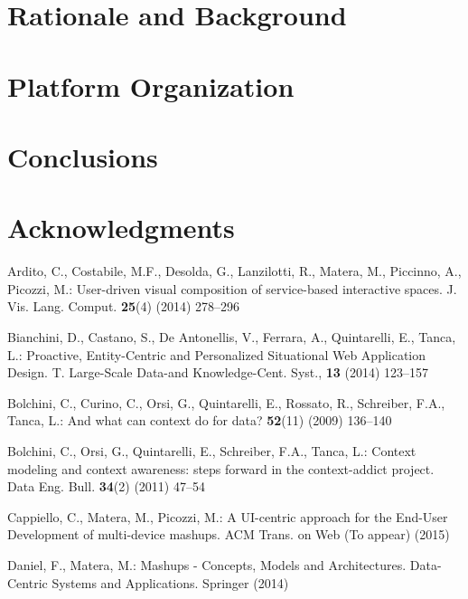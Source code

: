 \documentclass{llncs}
\begin{document}
\section{Rationale and Background}


\section{Platform Organization}


\section{Conclusions}


\section{Acknowledgments}



%
%

%

\begin{thebibliography}{1}

Ardito, C., Costabile, M.F., Desolda, G., Lanzilotti, R., Matera, M., Piccinno,
  A., Picozzi, M.:
\newblock User-driven visual composition of service-based interactive spaces.
\newblock J. Vis. Lang. Comput. \textbf{25}(4) (2014)  278--296

Bianchini, D., Castano, S., De Antonellis, V., Ferrara, A., Quintarelli, E., Tanca, L.:
 Proactive, Entity-Centric and Personalized Situational Web Application Design.
\newblock T. Large-Scale Data-and Knowledge-Cent. Syst., \textbf{13} (2014) 123--157

Bolchini, C., Curino, C., Orsi, G., Quintarelli, E., Rossato, R., Schreiber,
  F.A., Tanca, L.:
\newblock And what can context do for data?
 \textbf{52}(11) (2009)  136--140

Bolchini, C., Orsi, G., Quintarelli, E., Schreiber, F.A., Tanca, L.:
\newblock Context modeling and context awareness: steps forward in the
  context-addict project.
 Data Eng. Bull. \textbf{34}(2) (2011)  47--54

Cappiello, C., Matera, M., Picozzi, M.:
\newblock A {UI}-centric approach for the {End-User Development} of
  multi-device mashups.
\newblock ACM Trans. on Web (To appear) (2015)

Daniel, F., Matera, M.:
\newblock Mashups - Concepts, Models and Architectures.
\newblock Data-Centric Systems and Applications. Springer (2014)

\end{thebibliography}
\end{document}
